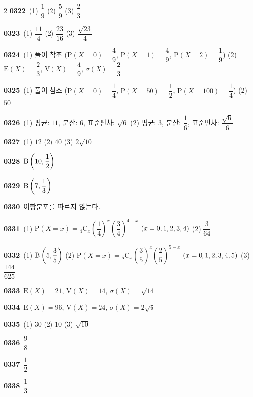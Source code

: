 \documentclass[10pt,a4paper]{article}
\begin{document}
\begin{multicols}{2}
\noindent\textbf{0322}\ (1) $\dfrac{1}{9}$ (2) $\dfrac{5}{9}$ (3) $\dfrac{2}{3}$\par
\noindent\textbf{0323}\ (1) $\dfrac{11}{4}$ (2) $\dfrac{23}{16}$ (3) $\dfrac{\sqrt{23}}{4}$\par
\noindent\textbf{0324}\ (1) 풀이 참조 ($\mathrm{P}(X=0)=\dfrac{4}{9}$, $\mathrm{P}(X=1)=\dfrac{4}{9}$, $\mathrm{P}(X=2)=\dfrac{1}{9}$) (2) $\mathrm{E}(X)=\dfrac{2}{3}$, $\mathrm{V}(X)=\dfrac{4}{9}$, $\sigma(X)=\dfrac{2}{3}$\par
\noindent\textbf{0325}\ (1) 풀이 참조 ($\mathrm{P}(X=0)=\dfrac{1}{4}$, $\mathrm{P}(X=50)=\dfrac{1}{2}$, $\mathrm{P}(X=100)=\dfrac{1}{4}$) (2) $50$\par
\noindent\textbf{0326}\ (1) 평균: $11$, 분산: $6$, 표준편차: $\sqrt{6}$ (2) 평균: $3$, 분산: $\dfrac{1}{6}$, 표준편차: $\dfrac{\sqrt{6}}{6}$\par
\noindent\textbf{0327}\ (1) $12$ (2) $40$ (3) $2\sqrt{10}$\par
\noindent\textbf{0328}\ $\mathrm{B}\left(10{,}\mkern3mu\mathopen{}\dfrac{1}{2}\right)$\par
\noindent\textbf{0329}\ $\mathrm{B}\left(7{,}\mkern3mu\mathopen{}\dfrac{1}{3}\right)$\par
\noindent\textbf{0330}\ 이항분포를 따르지 않는다.\par
\noindent\textbf{0331}\ (1) $\mathrm{P}(X=x)={}_4\mathrm{C}_x\left(\dfrac{1}{4}\right)^{x}\left(\dfrac{3}{4}\right)^{4-x}$ $(x=0{,}\mkern3mu\mathopen{}1{,}\mkern3mu\mathopen{}2{,}\mkern3mu\mathopen{}3{,}\mkern3mu\mathopen{}4)$ (2) $\dfrac{3}{64}$\par
\noindent\textbf{0332}\ (1) $\mathrm{B}\left(5{,}\mkern3mu\mathopen{}\dfrac{3}{5}\right)$ (2) $\mathrm{P}(X=x)={}_5\mathrm{C}_x\left(\dfrac{3}{5}\right)^{x}\left(\dfrac{2}{5}\right)^{5-x}$ $(x=0{,}\mkern3mu\mathopen{}1{,}\mkern3mu\mathopen{}2{,}\mkern3mu\mathopen{}3{,}\mkern3mu\mathopen{}4{,}\mkern3mu\mathopen{}5)$ (3) $\dfrac{144}{625}$\par
\noindent\textbf{0333}\ $\mathrm{E}(X)=21$, $\mathrm{V}(X)=14$, $\sigma(X)=\sqrt{14}$\par
\noindent\textbf{0334}\ $\mathrm{E}(X)=96$, $\mathrm{V}(X)=24$, $\sigma(X)=2\sqrt{6}$\par
\noindent\textbf{0335}\ (1) $30$ (2) $10$ (3) $\sqrt{10}$\par
\noindent\textbf{0336}\ $\dfrac{9}{8}$\par
\noindent\textbf{0337}\ $\dfrac{1}{2}$\par
\noindent\textbf{0338}\ $\dfrac{1}{3}$\par

\end{multicols}
\end{document}
